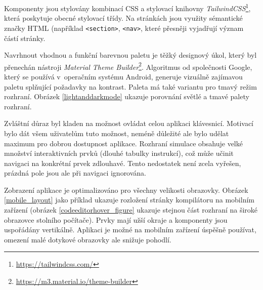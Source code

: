 Komponenty jsou stylovány kombinací CSS a stylovací knihovny \emph{TailwindCSS}\footnote{\url{https://tailwindcss.com/}}, která poskytuje obecné stylovací třídy.
Na stránkách jsou využity sémantické značky HTML (například \texttt{<section>}, \texttt{<nav>}, které přesněji vyjadřují význam částí stránky.

Navrhnout vhodnou a funkční barevnou paletu je těžký designový úkol, který byl přenechán nástroji \emph{Material Theme Builder}\footnote{\url{https://m3.material.io/theme-builder}}.
Algoritmus od společnosti Google, který se používá v~operačním systému Android, generuje vizuálně zajímavou paletu splňující požadavky na kontrast.
Paleta má také variantu pro tmavý režim rozhraní.
Obrázek \ref{lightanddarkmode} ukazuje porovnání světlé a tmavé palety rozhraní.

Zvláštní důraz byl kladen na možnost ovládat celou aplikaci klávesnicí.
Motivací bylo dát všem uživatelům tuto možnost, neméně důležité ale bylo udělat maximum pro dobrou dostupnost aplikace.
Rozhraní simulace obsahuje velké množství interaktivních prvků (dlouhé tabulky instrukcí), což může učinit navigaci na konkrétní prvek zdlouhavé.
Tento nedostatek není zcela vyřešen, prázdná pole jsou ale při navigaci ignorována.

Zobrazení aplikace je optimalizováno pro všechny velikosti obrazovky.
Obrázek \ref{mobile_layout} jako příklad ukazuje rozložení stránky kompilátoru na mobilním zařízení (obrázek \ref{codeeditorhover_figure} ukazuje stejnou část rozhraní na široké obrazovce stolního počítače).
Prvky mají užší okraje a komponenty jsou uspořádány vertikálně.
Aplikaci je možné na mobilním zařízení úspěšně používat, omezení malé dotykové obrazovky ale snižuje pohodlí.

